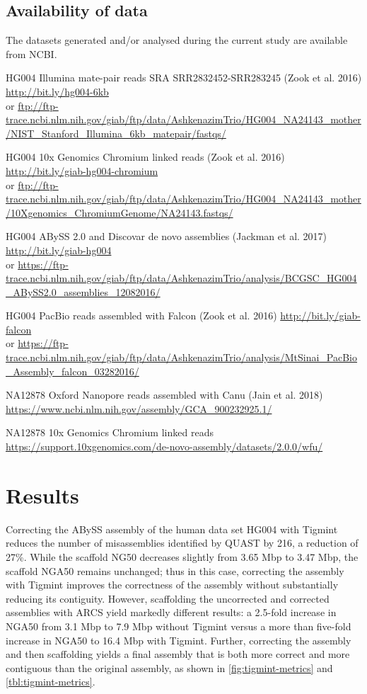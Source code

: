 \documentclass[
  12pt,
  oneside,
  openany]{book}
\begin{document}
\hypertarget{availability-of-data}{%
\subsection{Availability of data}\label{availability-of-data}}

The datasets generated and/or analysed during the current study are available from NCBI.

HG004 Illumina mate-pair reads SRA SRR2832452-SRR283245 (Zook et al. 2016) \url{http://bit.ly/hg004-6kb}\\
or \url{ftp://ftp-trace.ncbi.nlm.nih.gov/giab/ftp/data/AshkenazimTrio/HG004_NA24143_mother/NIST_Stanford_Illumina_6kb_matepair/fastqs/}

HG004 10x Genomics Chromium linked reads (Zook et al. 2016) \url{http://bit.ly/giab-hg004-chromium}\\
or \url{ftp://ftp-trace.ncbi.nlm.nih.gov/giab/ftp/data/AshkenazimTrio/HG004_NA24143_mother/10Xgenomics_ChromiumGenome/NA24143.fastqs/}

HG004 ABySS 2.0 and Discovar de novo assemblies (Jackman et al. 2017) \url{http://bit.ly/giab-hg004}\\
or \url{https://ftp-trace.ncbi.nlm.nih.gov/giab/ftp/data/AshkenazimTrio/analysis/BCGSC_HG004_ABySS2.0_assemblies_12082016/}

HG004 PacBio reads assembled with Falcon (Zook et al. 2016) \url{http://bit.ly/giab-falcon}\\
or \url{https://ftp-trace.ncbi.nlm.nih.gov/giab/ftp/data/AshkenazimTrio/analysis/MtSinai_PacBio_Assembly_falcon_03282016/}

NA12878 Oxford Nanopore reads assembled with Canu (Jain et al. 2018)\\
\url{https://www.ncbi.nlm.nih.gov/assembly/GCA_900232925.1/}

NA12878 10x Genomics Chromium linked reads\\
\url{https://support.10xgenomics.com/de-novo-assembly/datasets/2.0.0/wfu/}

\hypertarget{results-1}{%
\section{Results}\label{results-1}}

Correcting the ABySS assembly of the human data set HG004 with Tigmint reduces the number of misassemblies identified by QUAST by 216, a reduction of 27\%. While the scaffold NG50 decreases slightly from 3.65 Mbp to 3.47 Mbp, the scaffold NGA50 remains unchanged; thus in this case, correcting the assembly with Tigmint improves the correctness of the assembly without substantially reducing its contiguity. However, scaffolding the uncorrected and corrected assemblies with ARCS yield markedly different results: a 2.5-fold increase in NGA50 from 3.1 Mbp to 7.9 Mbp without Tigmint versus a more than five-fold increase in NGA50 to 16.4 Mbp with Tigmint. Further, correcting the assembly and then scaffolding yields a final assembly that is both more correct and more contiguous than the original assembly, as shown in \cref{fig:tigmint-metrics} and \cref{tbl:tigmint-metrics}.
\end{document}
